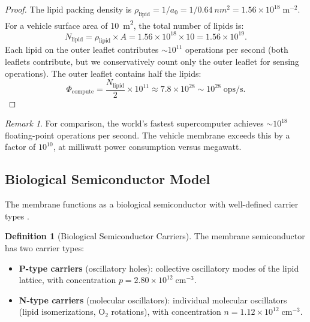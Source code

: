 \documentclass[twocolumn,10pt]{article}
\theoremstyle{definition}
\newtheorem{definition}[theorem]{Definition}
\theoremstyle{remark}
\newtheorem{remark}[theorem]{Remark}
\begin{document}
\begin{proof}
The lipid packing density is $\rho_{\mathrm{lipid}} = 1/a_0 = 1/\SI{0.64}{nm^2} = 1.56 \times 10^{18}\;\mathrm{m}^{-2}$. For a vehicle surface area of \SI{10}{m^2}, the total number of lipids is:
\begin{equation}
  N_{\mathrm{lipid}} = \rho_{\mathrm{lipid}} \times A = 1.56 \times 10^{18} \times 10 = 1.56 \times 10^{19}.
  \label{eq:n_lipid}
\end{equation}
Each lipid on the outer leaflet contributes $\sim 10^{11}$ operations per second (both leaflets contribute, but we conservatively count only the outer leaflet for sensing operations). The outer leaflet contains half the lipids:
\begin{equation}
  \Phi_{\mathrm{compute}} = \frac{N_{\mathrm{lipid}}}{2} \times 10^{11} \approx 7.8 \times 10^{28} \sim 10^{28}\;\mathrm{ops/s}.
  \label{eq:phi_compute}
\end{equation}
\end{proof}

\begin{remark}
For comparison, the world's fastest supercomputer achieves $\sim 10^{18}$ floating-point operations per second. The vehicle membrane exceeds this by a factor of $10^{10}$, at milliwatt power consumption versus megawatt.
\end{remark}

\subsection{Biological Semiconductor Model}

The membrane functions as a biological semiconductor with well-defined carrier types \cite{sachikonye2025circuits, sze2007physics}.

\begin{definition}[Biological Semiconductor Carriers]
\label{def:bio_semiconductor}
The membrane semiconductor has two carrier types:
\begin{itemize}
  \item \textbf{P-type carriers} (oscillatory holes): collective oscillatory modes of the lipid lattice, with concentration $p = 2.80 \times 10^{12}\;\mathrm{cm}^{-3}$.
  \item \textbf{N-type carriers} (molecular oscillators): individual molecular oscillators (lipid isomerizations, O$_2$ rotations), with concentration $n = 1.12 \times 10^{12}\;\mathrm{cm}^{-3}$.
\end{itemize}
\end{definition}
\end{document}
